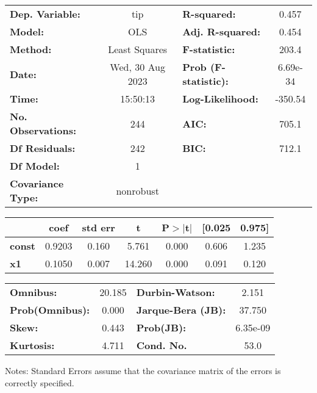 \begin{center}
\begin{tabular}{lclc}
\toprule
\textbf{Dep. Variable:}    &       tip        & \textbf{  R-squared:         } &     0.457   \\
\textbf{Model:}            &       OLS        & \textbf{  Adj. R-squared:    } &     0.454   \\
\textbf{Method:}           &  Least Squares   & \textbf{  F-statistic:       } &     203.4   \\
\textbf{Date:}             & Wed, 30 Aug 2023 & \textbf{  Prob (F-statistic):} &  6.69e-34   \\
\textbf{Time:}             &     15:50:13     & \textbf{  Log-Likelihood:    } &   -350.54   \\
\textbf{No. Observations:} &         244      & \textbf{  AIC:               } &     705.1   \\
\textbf{Df Residuals:}     &         242      & \textbf{  BIC:               } &     712.1   \\
\textbf{Df Model:}         &           1      & \textbf{                     } &             \\
\textbf{Covariance Type:}  &    nonrobust     & \textbf{                     } &             \\
\bottomrule
\end{tabular}
\begin{tabular}{lcccccc}
               & \textbf{coef} & \textbf{std err} & \textbf{t} & \textbf{P$> |$t$|$} & \textbf{[0.025} & \textbf{0.975]}  \\
\midrule
\textbf{const} &       0.9203  &        0.160     &     5.761  &         0.000        &        0.606    &        1.235     \\
\textbf{x1}    &       0.1050  &        0.007     &    14.260  &         0.000        &        0.091    &        0.120     \\
\bottomrule
\end{tabular}
\begin{tabular}{lclc}
\textbf{Omnibus:}       & 20.185 & \textbf{  Durbin-Watson:     } &    2.151  \\
\textbf{Prob(Omnibus):} &  0.000 & \textbf{  Jarque-Bera (JB):  } &   37.750  \\
\textbf{Skew:}          &  0.443 & \textbf{  Prob(JB):          } & 6.35e-09  \\
\textbf{Kurtosis:}      &  4.711 & \textbf{  Cond. No.          } &     53.0  \\
\bottomrule
\end{tabular}
\end{center}

Notes: \newline
 [1] Standard Errors assume that the covariance matrix of the errors is correctly specified.